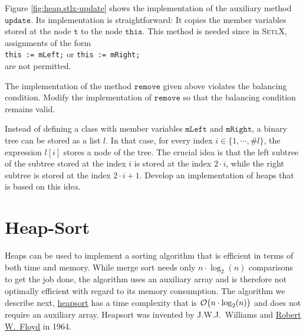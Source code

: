 \noindent 
Figure \ref{fig:heap.stlx-update} shows the implementation of the auxiliary method $\mathtt{update}$.
Its implementation is straightforward: It copies the member variables stored at the node $\mathtt{t}$
to the node $\mathtt{this}$.  This method is needed since in \textsc{SetlX}, assignments of the form
\\[0.2cm]
\hspace*{1.3cm}
\texttt{this := mLeft;} \quad or \quad \texttt{this := mRight;}
\\[0.2cm]
are not permitted.


\exercise
The implementation of the method $\mathtt{remove}$ given above violates the balancing condition.
Modify the implementation of $\mathtt{remove}$ so that the balancing condition remains valid.

\exercise
Instead of defining a class with member variables $\mathtt{mLeft}$ and $\mathtt{mRight}$, a binary tree
can be stored as a list $l$.  In that case, for every index $i \in \{1, \cdots, \mathtt{\#}l \}$,
the expression $l[i]$ stores a node of the tree.  The crucial idea is that the left subtree of the
subtree stored at the index $i$ is stored at the index $2 \cdot i$, while the right subtree is
stored at the index $2 \cdot i + 1$.  Develop an implementation of heaps that is based on this idea.

\section{Heap-Sort}
Heaps can be used to implement a sorting algorithm that is efficient in terms of both time and
memory. While merge sort needs only $n \cdot \log_2(n)$ comparisons to get the job done, the
algorithm uses an auxiliary array and is therefore not optimally efficient with regard to its memory
consumption.  The algorithm we describe next, \href{https://en.wikipedia.org/wiki/Heapsort}{heapsort} has
a time complexity that is $\mathcal{O}\bigl(n \cdot \log_2(n)\bigr)$ and does not require an auxiliary
array.  Heapsort was invented by J.W.J.~Williams and
\href{https://en.wikipedia.org/wiki/Robert_W._Floyd}{Robert W.~Floyd} in 1964.

